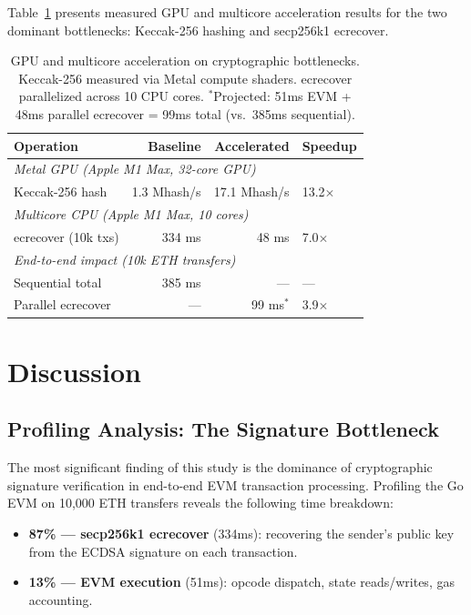 \documentclass[11pt,twocolumn]{article}
\begin{document}
Table~\ref{tab:gpu} presents measured GPU and multicore acceleration results
for the two dominant bottlenecks: Keccak-256 hashing and secp256k1 ecrecover.

\begin{table}[h]
\centering
\small
\begin{tabular}{lrrl}
\toprule
\textbf{Operation} & \textbf{Baseline} & \textbf{Accelerated} & \textbf{Speedup} \\
\midrule
\multicolumn{4}{l}{\textit{Metal GPU (Apple M1 Max, 32-core GPU)}} \\
Keccak-256 hash    & 1.3 Mhash/s & 17.1 Mhash/s & 13.2$\times$ \\
\midrule
\multicolumn{4}{l}{\textit{Multicore CPU (Apple M1 Max, 10 cores)}} \\
ecrecover (10k txs) & 334 ms       & 48 ms         & 7.0$\times$ \\
\midrule
\multicolumn{4}{l}{\textit{End-to-end impact (10k ETH transfers)}} \\
Sequential total    & 385 ms       & ---            & --- \\
Parallel ecrecover  & ---          & 99 ms$^*$      & 3.9$\times$ \\
\bottomrule
\end{tabular}
\caption{GPU and multicore acceleration on cryptographic bottlenecks.
Keccak-256 measured via Metal compute shaders. ecrecover parallelized
across 10 CPU cores.
$^*$Projected: 51ms EVM + 48ms parallel ecrecover = 99ms total
(vs.\ 385ms sequential).}
\label{tab:gpu}
\end{table}

\section{Discussion}

\subsection{Profiling Analysis: The Signature Bottleneck}

The most significant finding of this study is the dominance of cryptographic
signature verification in end-to-end EVM transaction processing. Profiling
the Go EVM on 10,000 ETH transfers reveals the following time breakdown:

\begin{itemize}
\item \textbf{87\% --- secp256k1 ecrecover} (334ms): recovering the sender's
      public key from the ECDSA signature on each transaction.
\item \textbf{13\% --- EVM execution} (51ms): opcode dispatch, state reads/writes,
      gas accounting.
\end{itemize}
\end{document}
